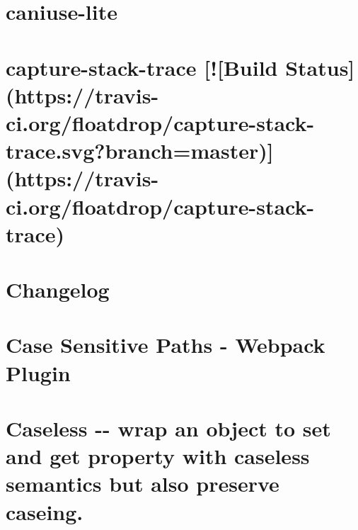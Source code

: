\documentclass[twoside]{book}
\newcommand{\+}{\discretionary{\mbox{\scriptsize$\hookleftarrow$}}{}{}}
\begin{document}
\chapter{caniuse-\/lite}
\label{md__c_1_workspace_demo_src_main_script_node_modules_caniuse-lite__r_e_a_d_m_e}

\chapter{capture-\/stack-\/trace \mbox{[}!\mbox{[}Build Status\mbox{]}(https\+://travis-\/ci.org/floatdrop/capture-\/stack-\/trace.svg?branch=master)\mbox{]}(https\+://travis-\/ci.org/floatdrop/capture-\/stack-\/trace)}
\label{md__c_1_workspace_demo_src_main_script_node_modules_capture-stack-trace_readme}

\chapter{Changelog}
\label{md__c_1_workspace_demo_src_main_script_node_modules_case-sensitive-paths-webpack-plugin__c_h_a_n_g_e_l_o_g}

\chapter{Case Sensitive Paths -\/ Webpack Plugin}
\label{md__c_1_workspace_demo_src_main_script_node_modules_case-sensitive-paths-webpack-plugin__r_e_a_d_m_e}

\chapter{Caseless -\/-\/ wrap an object to set and get property with caseless semantics but also preserve caseing.}
\label{md__c_1_workspace_demo_src_main_script_node_modules_caseless__r_e_a_d_m_e}

\end{document}
